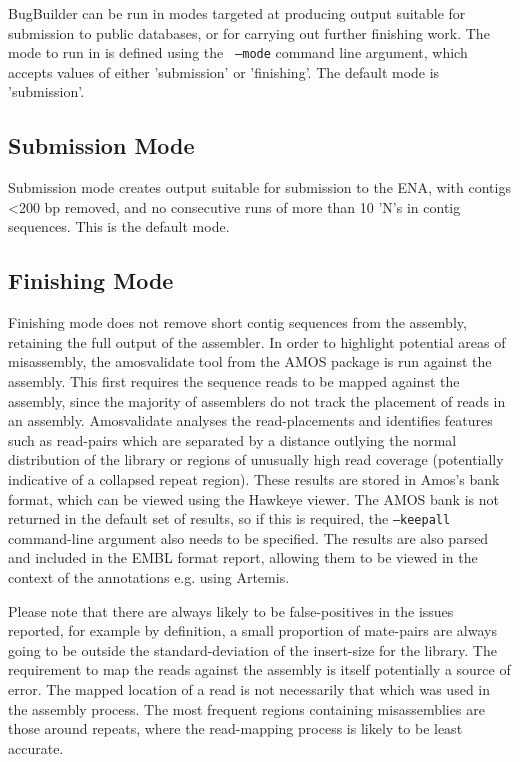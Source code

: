\documentclass[a4paper,twoside,10pt]{article}
\begin{document}
BugBuilder can be run in modes targeted at producing output suitable for submission to public
databases, or for carrying out further finishing work. The mode to run in is defined using the {\tt
--mode} command line argument, which accepts values of either 'submission' or 'finishing'. The
default mode is 'submission'.

\subsection{Submission Mode}

Submission mode creates output suitable for submission to the ENA, with contigs \textless200 bp removed,
and no consecutive runs of more than 10 'N's in contig sequences. This is the default mode. 

\subsection{Finishing Mode}

Finishing mode does not remove short contig sequences from the assembly, retaining the full output
of the assembler. In order to highlight potential areas of misassembly, the amosvalidate tool from
the AMOS package is run against the assembly. This first requires the sequence reads to be mapped
against the assembly, since the majority of assemblers do not track the placement of reads in an
assembly. Amosvalidate analyses the read-placements and identifies features such as read-pairs
which are separated by a distance outlying the normal distribution of the library or regions of
unusually high read coverage (potentially indicative of a collapsed repeat region). These results
are stored in Amos's bank format, which can be viewed using the Hawkeye viewer. The AMOS bank is
not returned in the default set of results, so if this is required, the {\tt --keepall}
command-line argument also needs to be specified. The results are also parsed and included in the
EMBL format report, allowing them to be viewed in the context of the annotations e.g. using
Artemis.

Please note that there are always likely to be false-positives in the issues reported, for example
by definition, a small proportion of mate-pairs are always going to be outside the
standard-deviation of the insert-size for the library. The requirement to map the reads against the
assembly is itself potentially a source of error. The mapped location of a read is not necessarily
that which was used in the assembly process. The most frequent regions containing misassemblies are
those around repeats, where the read-mapping process is likely to be least accurate. 
\end{document}
